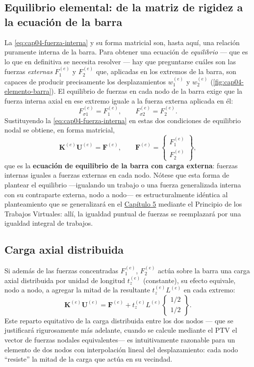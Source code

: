 \subsection{Equilibrio elemental: de la matriz de rigidez a la ecuación de la barra}

La \cref{eq:cap04-fuerza-interna} y su forma matricial son, hasta aquí, una relación puramente interna de la barra. Para obtener una ecuación de \emph{equilibrio} --- que es lo que en definitiva se necesita resolver --- hay que preguntarse cuáles son las fuerzas \emph{externas} $F_1^{(e)}$ y $F_2^{(e)}$ que, aplicadas en los extremos de la barra, son capaces de producir precisamente los desplazamientos $w_1^{(e)}$ y $w_2^{(e)}$ (\cref{fig:cap04-elemento-barra}). El equilibrio de fuerzas en cada nodo de la barra exige que la fuerza interna axial en ese extremo iguale a la fuerza externa aplicada en él:
\[
F_{\sigma 1}^{(e)} = F_1^{(e)}, \qquad F_{\sigma 2}^{(e)} = F_2^{(e)} .
\]
Sustituyendo la \cref{eq:cap04-fuerza-interna} en estas dos condiciones de equilibrio nodal se obtiene, en forma matricial,
\begin{equation}
\mathbf{K}^{(e)} \mathbf{U}^{(e)} = \mathbf{F}^{(e)}, \qquad \mathbf{F}^{(e)} = \begin{Bmatrix} F_1^{(e)} \\ F_2^{(e)} \end{Bmatrix} ,
\label{eq:cap04-equilibrio-elemental}
\end{equation}
que es la \textbf{ecuación de equilibrio de la barra con carga externa}: fuerzas internas iguales a fuerzas externas en cada nodo. Nótese que esta forma de plantear el equilibrio ---igualando un trabajo o una fuerza generalizada interna con su contraparte externa, nodo a nodo--- es estructuralmente idéntica al planteamiento que se generalizará en el \hyperref[cap:cap05-ptv]{Capítulo 5} mediante el Principio de los Trabajos Virtuales: allí, la igualdad puntual de fuerzas se reemplazará por una igualdad integral de trabajos.

\subsection{Carga axial distribuida}

Si además de las fuerzas concentradas $F_1^{(e)}$, $F_2^{(e)}$ actúa sobre la barra una carga axial distribuida por unidad de longitud $t_z^{(e)}$ (constante), su efecto equivale, nodo a nodo, a agregar la mitad de la resultante $t_z^{(e)}L^{(e)}$ en cada extremo:
\begin{equation}
\mathbf{K}^{(e)}\mathbf{U}^{(e)} = \mathbf{F}^{(e)} + t_z^{(e)} L^{(e)} \begin{Bmatrix} 1/2 \\ 1/2 \end{Bmatrix} .
\end{equation}
Este reparto equitativo de la carga distribuida entre los dos nodos --- que se justificará rigurosamente más adelante, cuando se calcule mediante el PTV el vector de fuerzas nodales equivalentes--- es intuitivamente razonable para un elemento de dos nodos con interpolación lineal del desplazamiento: cada nodo ``resiste'' la mitad de la carga que actúa en su vecindad.

